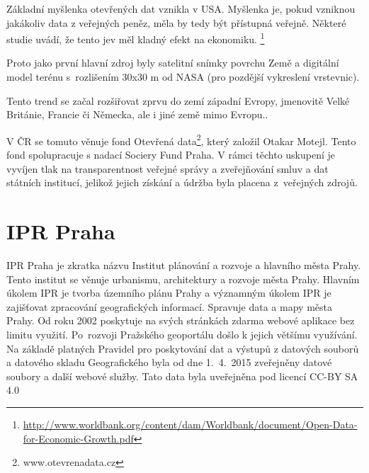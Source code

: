 Základní myšlenka otevřených dat vznikla v USA.
Myšlenka je, pokud vzniknou jakákoliv data z veřejných peněz, měla by tedy být
přístupná veřejně. Některé studie uvádí, že tento jev měl kladný efekt na ekonomiku.
\footnote{\url{http://www.worldbank.org/content/dam/Worldbank/document/Open-Data-for-Economic-Growth.pdf}}

Proto jako první hlavní zdroj byly satelitní snímky povrchu Země a digitální model terénu
s~rozlišením 30x30 m od NASA (pro pozdější vykreslení vrstevnic).

Tento trend se začal rozšiřovat zprvu do zemí západní Evropy,
jmenovitě Velké Británie, Francie či Německa, ale i jiné země mimo Evropu..

V ČR se tomuto věnuje fond Otevřená data\footnote{www.otevrenadata.cz}, který založil Otakar
Motejl. Tento fond spolupracuje s nadací Sociery Fund Praha. V rámci
těchto uskupení je vyvíjen tlak na transparentnost veřejné správy a
zveřejňování smluv a dat
státních institucí, jelikož jejich získání a údržba byla placena
z~veřejných zdrojů.

\section{IPR Praha}
\label{IPR Praha}
IPR Praha je zkratka názvu Institut plánování a rozvoje a hlavního města Prahy. 
Tento institut se věnuje urbanismu, architektury a rozvoje města Prahy. Hlavním
úkolem IPR je tvorba územního plánu Prahy a významným úkolem IPR je zajišťovat
zpracování geografických informací. Spravuje data a mapy města Prahy. Od roku 
2002 poskytuje na svých stránkách zdarma webové aplikace bez limitu využití. 
Po~rozvoji Pražského geoportálu došlo k jejich většímu využívání.  Na základě 
platných Pravidel pro poskytování dat a  výstupů z datových souborů a datového 
skladu Geografického byla od dne 1.~4.~2015 zveřejněny datové soubory a další 
webové služby. Tato data byla uveřejněna pod licencí CC-BY SA 4.0 \cite{IPR}
